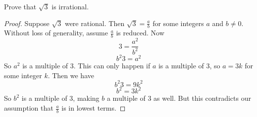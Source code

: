 \begin{questions}
\begin{answer}
   \end{answer}
   
   
  
   
   
 \question Prove that $\sqrt 3$ is irrational.
 
   \begin{answer}
     \begin{proof}
      Suppose $\sqrt{3}$ were rational.  Then $\sqrt{3} = \frac{a}{b}$ for some integers $a$ and $b \ne 0$.  Without loss of generality, assume $\frac{a}{b}$ is reduced.  Now
 \[3 = \frac{a^2}{b^2}\]
 \[b^2 3 = a^2\]
 So $a^2$ is a multiple of 3.  This can only happen if $a$ is a multiple of 3, so $a = 3k$ for some integer $k$.  Then we have
 \[b^2 3 = 9k^2\]
 \[b^2 = 3k^2\]
 So $b^2$ is a multiple of 3, making $b$ a multiple of 3 as well.  But this contradicts our assumption that $\frac{a}{b}$ is in lowest terms.
     \end{proof}
   \end{answer}
 
 

\end{questions}